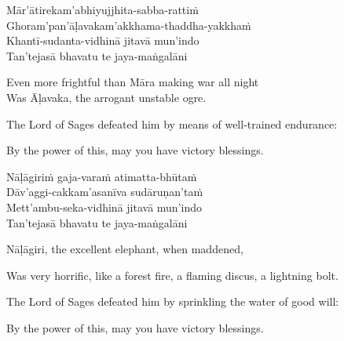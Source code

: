 \begin{pali-hang-continued}
  Mār'ātirekam'abhiyujjhita-sabba-rattiṁ\\
  Ghoram'pan'āḷavakam'akkhama-thaddha-yakkhaṁ\\
  Khantī-sudanta-vidhinā jitavā mun'indo\\
  Tan'tejasā bhavatu te jaya-maṅgalāni
\end{pali-hang-continued}

\ifninebythirteen\clearpage\fi

\begin{english-verses}
  Even more frightful than Māra making war all night\\
  Was Āḷavaka, the arrogant unstable ogre.\\
  \begin{english-hang-together-verses}
  The Lord of Sages defeated him by means of well-trained endurance:\\
  \end{english-hang-together-verses}
  \begin{english-hang-together-verses}
  By the power of this, may you have victory blessings.
  \end{english-hang-together-verses}
\end{english-verses}

\begin{pali-hang-continued}
  Nāḷāgiriṁ gaja-varaṁ atimatta-bhūtaṁ\\
  Dāv'aggi-cakkam'asanīva sudāruṇan'taṁ\\
  Mett'ambu-seka-vidhinā jitavā mun'indo\\
  Tan'tejasā bhavatu te jaya-maṅgalāni\\
\end{pali-hang-continued}

\ifbfive\clearpage\fi

\begin{english-verses}
  Nāḷāgiri, the excellent elephant, when maddened,\\
  \begin{english-hang-together-verses}
  Was very horrific, like a forest fire, a flaming discus, a lightning bolt.\\
  \end{english-hang-together-verses}
  \begin{english-hang-together-verses}
  The Lord of Sages defeated him by sprinkling the water of good will:\\
  \end{english-hang-together-verses}
  \begin{english-hang-together-verses}
  By the power of this, may you have victory blessings.
  \end{english-hang-together-verses}
\end{english-verses}

